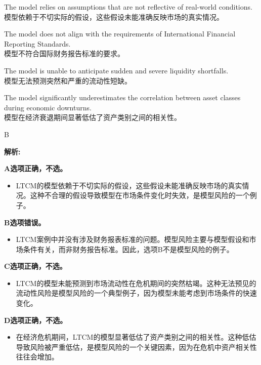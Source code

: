 \documentclass{article}
\newenvironment{explanation}
{\textbf{解析:}\par}
{\par}
\begin{document}
\begin{choices}
    \item The model relies on assumptions that are not reflective of real-world conditions. \\
    模型依赖于不切实际的假设，这些假设未能准确反映市场的真实情况。
    \item The model does not align with the requirements of International Financial Reporting Standards. \\
    模型不符合国际财务报告标准的要求。
    \item The model is unable to anticipate sudden and severe liquidity shortfalls. \\
    模型无法预测突然和严重的流动性短缺。
    \item The model significantly underestimates the correlation between asset classes during economic downturns. \\
    模型在经济衰退期间显著低估了资产类别之间的相关性。
\end{choices}

\begin{correctanswer}
    B
\end{correctanswer}

\begin{explanation}
    \textbf{A选项正确，不选。}
    \begin{itemize}
        \item LTCM的模型依赖于不切实际的假设，这些假设未能准确反映市场的真实情况。这种不合理的假设导致模型在市场条件变化时失效，是模型风险的一个例子。
    \end{itemize}

    \textbf{B选项错误。}
    \begin{itemize}
        \item LTCM案例中并没有涉及财务报表标准的问题。模型风险主要与模型假设和市场条件有关，而非财务报告标准。因此，选项B不是模型风险的例子。
    \end{itemize}

    \textbf{C选项正确，不选。}
    \begin{itemize}
        \item LTCM的模型未能预测到市场流动性在危机期间的突然枯竭。这种无法预见的流动性风险是模型风险的一个典型例子，因为模型未能考虑到市场条件的快速变化。
    \end{itemize}

    \textbf{D选项正确，不选。}
    \begin{itemize}
        \item 在经济危机期间，LTCM的模型显著低估了资产类别之间的相关性。这种低估导致风险被严重低估，是模型风险的一个关键因素，因为在危机中资产相关性往往会增加。
    \end{itemize}
\end{explanation}
\end{document}
